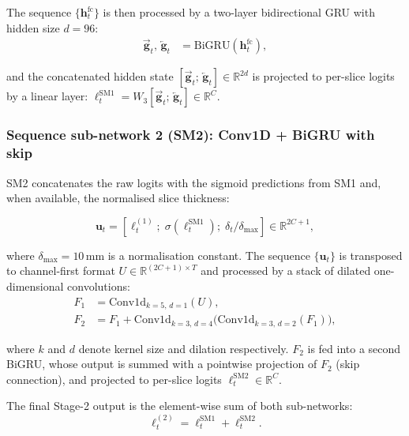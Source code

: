 The sequence $\{\mathbf{h}_t^{\mathrm{fc}}\}$ is then processed by a
two-layer bidirectional GRU with hidden size $d = 96$:
\begin{align}
    \overrightarrow{\mathbf{g}}_t,\, \overleftarrow{\mathbf{g}}_t
        &= \mathrm{BiGRU}\!\left(\mathbf{h}_t^{\mathrm{fc}}\right),
    \label{eq:sm1_gru}
\end{align}

and the concatenated hidden state
$[\overrightarrow{\mathbf{g}}_t;\, \overleftarrow{\mathbf{g}}_t] \in \mathbb{R}^{2d}$
is projected to per-slice logits by a linear layer:
$\boldsymbol{\ell}_t^{\mathrm{SM1}} = W_3 [\overrightarrow{\mathbf{g}}_t;\, \overleftarrow{\mathbf{g}}_t]
\in \mathbb{R}^C$.

\subsubsection{Sequence sub-network 2 (SM2): Conv1D + BiGRU with skip}

SM2 concatenates the raw logits with the sigmoid predictions from SM1 and,
when available, the normalised slice thickness:

\begin{equation}
    \mathbf{u}_t = \left[\boldsymbol{\ell}_t^{(1)};\;
                         \sigma\!\left(\boldsymbol{\ell}_t^{\mathrm{SM1}}\right);\;
                         \delta_t / \delta_{\max}\right]
    \in \mathbb{R}^{2C+1},
    \label{eq:sm2_input}
\end{equation}

where $\delta_{\max} = 10\,\mathrm{mm}$ is a normalisation constant.
The sequence $\{\mathbf{u}_t\}$ is transposed to channel-first format
$U \in \mathbb{R}^{(2C+1) \times T}$ and processed by a stack of dilated
one-dimensional convolutions:
\begin{align}
    F_1 &= \mathrm{Conv1d}_{k=5,\,d=1}(U), \nonumber \\
    F_2 &= F_1 + \mathrm{Conv1d}_{k=3,\,d=4}\!\bigl(
               \mathrm{Conv1d}_{k=3,\,d=2}(F_1)\bigr),
    \label{eq:sm2_convs}
\end{align}

where $k$ and $d$ denote kernel size and dilation respectively.
$F_2$ is fed into a second BiGRU, whose output is summed with a pointwise
projection of $F_2$ (skip connection), and projected to per-slice logits
$\boldsymbol{\ell}_t^{\mathrm{SM2}} \in \mathbb{R}^C$.

The final Stage-2 output is the element-wise sum of both sub-networks:
\begin{equation}
    \boldsymbol{\ell}_t^{(2)} =
        \boldsymbol{\ell}_t^{\mathrm{SM1}} + \boldsymbol{\ell}_t^{\mathrm{SM2}}.
    \label{eq:stage2_out}
\end{equation}

